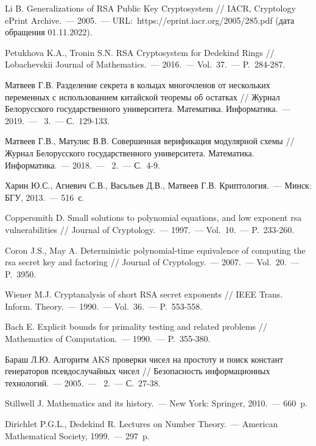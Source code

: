 \documentclass[_00_dissertation.tex]{subfiles}
\begin{document}
\begin{thebibliography}{99}
    Li B. Generalizations of RSA Public Key Cryptosystem // IACR, Cryptology ePrint Archive.~--- 2005.~--- URL:~https://eprint.iacr.org/2005/285.pdf (дата обращения 01.11.2022).

    Petukhova K.A., Tronin S.N. RSA Cryptosystem for Dedekind Rings // Lobachevskii Journal of Mathematics.~--- 2016.~--- Vol.~37.~--- P.~284-287.

    Матвеев Г.В. Разделение секрета в кольцах многочленов от нескольких переменных с использованием китайской теоремы об остатках // Журнал Белорусского государственного университета. Математика. Информатика.~--- 2019.~--- \textnumero~3.~--- С.~129-133.

    Матвеев Г.В., Матулис В.В. Совершенная верификация модулярной схемы // Журнал Белорусского государственного университета. Математика. Информатика.~--- 2018.~--- \textnumero~2.~--- С.~4-9.

    Харин Ю.С., Агиевич С.В., Васьльев Д.В., Матвеев Г.В. Криптология.~--- Минск: БГУ, 2013.~--- 516~с.

    Coppersmith D. Small solutions to polynomial equations, and low exponent rsa vulnerabilities // Journal of Cryptology.~--- 1997.~--- Vol.~10.~--- P.~233-260.

    Coron J.S., May A. Deterministic polynomial-time equivalence of computing the rsa secret key and factoring // Journal of Cryptology.~--- 2007.~--- Vol.~20.~--- P.~3950.

    Wiener M.J. Cryptanalysis of short RSA secret exponents // IEEE Trans. Inform. Theory.~--- 1990.~--- Vol.~36.~--- P.~553-558.

    Bach E. Explicit bounds for primality testing and related problems // Mathematics of Computation.~--- 1990.~--- P.~355-380.

    Бараш Л.Ю. Алгоритм AKS проверки чисел на простоту и поиск констант генераторов псевдослучайных чисел // Безопасность информационных технологий.~--- 2005.~--- \textnumero~2.~--- С.~27-38.

    Stillwell J. Mathematics and its history.~--- New York: Springer, 2010.~--- 660~p.

    Dirichlet P.G.L., Dedekind R. Lectures on Number Theory.~--- American Mathematical Society, 1999.~--- 297~p.


\end{thebibliography}
\end{document}
